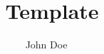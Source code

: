 \documentclass[a4paper, 10pt]{article}
\begin{document}
\title{\RyuOhTeX\  Template}
\author{John Doe}

\maketitle


\Shogiban{\hirate}
\end{document}
